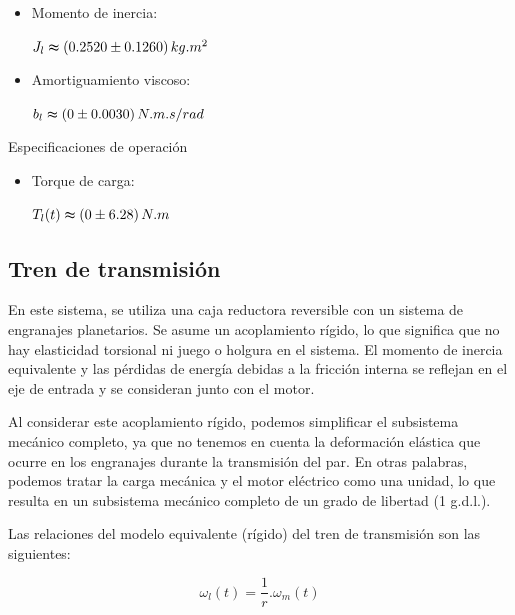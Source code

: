 \documentclass{article}
\begin{document}
    \begin{itemize}
        \item Momento de inercia: \quad\quad \begin{minipage}[c]{0.5\textwidth}
            \centering
            \(J_l \thickapprox (0.2520 \pm 0.1260) \, kg.m^2\)
            \end{minipage}
        \item Amortiguamiento viscoso: \begin{minipage}[c]{0.5\textwidth}
            \centering
            \(b_l \thickapprox (0 \pm 0.0030) \, N.m.s/rad \)
            \end{minipage}
    \end{itemize}


    Especificaciones de operación

    \begin{itemize}
        \item Torque de carga: \quad\quad\quad \begin{minipage}[c]{0.5\textwidth}
            \centering
            \(T_l(t) \thickapprox (0 \pm 6.28) \, N.m \)
            \end{minipage}
    \end{itemize}

\subsection{Tren de transmisión}

    En este sistema, se utiliza una caja reductora reversible con un sistema de engranajes planetarios. Se 
    asume un acoplamiento rígido, lo que significa que no hay elasticidad torsional ni 
    juego o holgura en el sistema. El momento de inercia equivalente y las pérdidas de energía debidas a la 
    fricción interna se reflejan en el eje de entrada y se consideran junto con el motor.

    Al considerar este acoplamiento rígido, podemos simplificar el subsistema mecánico completo, ya que no 
    tenemos en cuenta la deformación elástica que ocurre en los engranajes durante la transmisión del par. 
    En otras palabras, podemos tratar la carga mecánica y el motor eléctrico como una unidad, lo que resulta 
    en un subsistema mecánico completo de un grado de libertad (1 g.d.l.).

    Las relaciones del modelo equivalente (rígido) del tren de transmisión son las siguientes:

    \begin{equation}\label{eq:tren_de_transmision1}
        \omega_{l}(t) = \frac{1}{r}.\omega_{m}(t)
    \end{equation}
    
\end{document}
